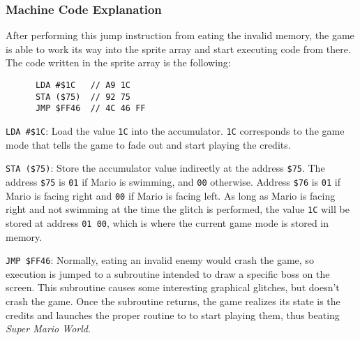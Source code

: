 \subsubsection{Machine Code Explanation}

After performing this jump instruction from eating the invalid memory, the game is able to work its way into the sprite array and start executing code from there. The code written in the sprite array is the following:

      \begin{lstlisting}
      LDA #$1C   // A9 1C
      STA ($75)  // 92 75
      JMP $FF46  // 4C 46 FF
      \end{lstlisting}

\texttt{LDA \#\$1C}: Load the value \texttt{1C} into the accumulator. \texttt{1C} corresponds to the game mode that tells the game to fade out and start playing the credits.

\texttt{STA (\$75)}: Store the accumulator value indirectly at the address \texttt{\$75}. The address \texttt{\$75} is \texttt{01} if Mario is swimming, and \texttt{00} otherwise. Address \texttt{\$76} is \texttt{01} if Mario is facing right and \texttt{00} if Mario is facing left. As long as Mario is facing right and not swimming at the time the glitch is performed, the value \texttt{1C} will be stored at address \texttt{01 00}, which is where the current game mode is stored in memory.

\texttt{JMP \$FF46}: Normally, eating an invalid enemy would crash the game, so execution is jumped to a subroutine intended to draw a specific boss on the screen. This subroutine causes some interesting graphical glitches, but doesn't crash the game. Once the subroutine returns, the game realizes its state is the credits and launches the proper routine to to start playing them, thus beating \textit{Super Mario World}.
